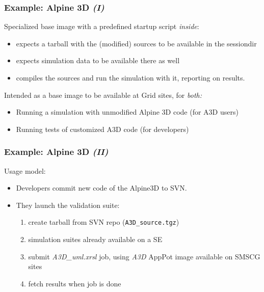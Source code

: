 \documentclass{beamer}
\begin{document}
\begin{frame}
  \frametitle{Example: Alpine 3D \emph{(I)}}
  \label{sec:17}
  
  Specialized base image with a predefined startup script \emph{inside}:
  \begin{itemize}
  \item expects a tarball with the (modified) sources to be available in
    the sessiondir
  \item expects simulation data to be available there as well
  \item compiles the sources and run the simulation with it, reporting on
    results.
  \end{itemize}
  
  Intended as a base image to be available at Grid sites, for \emph{both:}
  \begin{itemize}
  \item Running a simulation with unmodified Alpine 3D code (for A3D users)
  \item Running tests of customized A3D code (for developers)
  \end{itemize}
\end{frame}


\begin{frame}
  \frametitle{Example: Alpine 3D \emph{(II)}}
  Usage model:
  \begin{itemize}
  \item Developers commit new code of the Alpine3D to SVN.
  \item They launch the validation suite:
    \begin{enumerate}
    \item create tarball from SVN repo (\texttt{A3D{\_}source.tgz})
    \item simulation suites already available on a SE
    \item submit \emph{A3D{\_}uml.xrsl} job, using \emph{A3D} AppPot
      image available on SMSCG sites
    \item fetch results when job is done
    \end{enumerate}
  \end{itemize}
\end{frame}  
\end{document}
